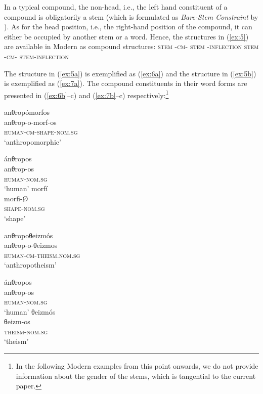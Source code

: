 \documentclass[output=paper]{LSP/langsci}
\begin{document}
In a typical  compound, the non-head, i.e., the left hand constituent of a compound is obligatorily a stem (which is formulated as \textit{Bare-Stem Constraint} by \citealt{RalliKarasimos2009}). As for the head position, i.e., the right-hand position of the compound, it can either be occupied by another stem or a word. Hence, the  structures in (\ref{ex:5}) are available in Modern  as compound structures:
\ea\label{ex:5}
	\ea\label{ex:5a}	 \lb{stem}  \textsc{stem} \rb{} -\textsc{cm}-  \textsc{stem} \rb{}\rb{} -\textsc{inflection} \rb{}
	\ex\label{ex:5b}     \textsc{stem} \rb{} -\textsc{cm}-  \textsc{stem}-\textsc{inflection} \rb{}\rb{}
	
	\hfill \citep[79,~ex.~(9)]{Ralli2013moderngreek}
	\z
\z
 
The structure in (\ref{ex:5a}) is exemplified as (\ref{ex:6a}) and the structure in (\ref{ex:5b}) is exemplified as (\ref{ex:7a}). The compound constituents in their word forms are presented in (\ref{ex:6b}--c) and (\ref{ex:7b}--c) respectively:\footnote{In the following Modern  examples from this point onwards, we do not provide information about the gender of the stems, which is tangential to the current paper.}

\ea\label{ex:6}
	\ea\label{ex:6a}
		\glll anθropómorfos\\
			anθrop-o-morf-os\\
			\textsc{human}-\textsc{cm}-\textsc{shape}-\textsc{nom.sg}\\
		\glt	`anthropomorphic'
\begin{multicols}{2}
	\ex\label{ex:6b}
		\glll ánθropos\\
				anθrop-os\\
				\textsc{human}-\textsc{nom.sg}\\
		\glt `human'
	\ex\label{ex:6c}
		\glll morfí\\
			morfi-\O \\
			\textsc{shape}-\textsc{nom.sg}\\
		\glt `shape'
	\end{multicols}
	\z
\z

\ea\label{ex:7}
	\ea\label{ex:7a}
		\glll	anθropoθeizmós\\
				anθrop-o-θeizmos\\
				\textsc{human}-\textsc{cm}-\textsc{theism}.\textsc{nom.sg}\\
		\glt	`anthropotheism'
\begin{multicols}{2}
	\ex\label{ex:7b}
		\glll ánθropos\\
				anθrop-os\\
				\textsc{human}-\textsc{nom.sg}\\
		\glt `human'
	\ex\label{ex:7c}
		\glll	θeizmós\\
				θeizm-os\\
				\textsc{theism}-\textsc{nom.sg}\\
		\glt `theism'
\end{multicols}
	\z
\z
\end{document}
